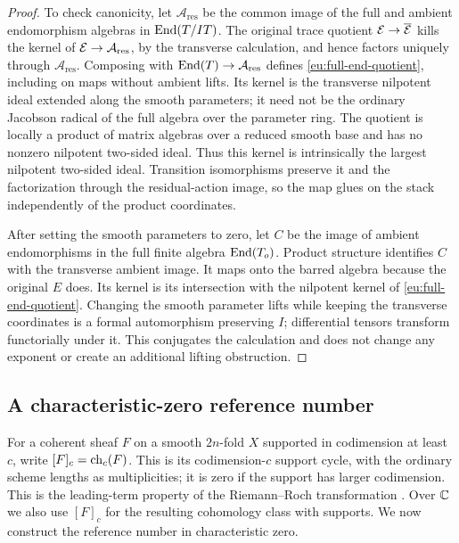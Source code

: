 \begin{proof}
To check canonicity, let $\mathcal A_{\mathrm{res}}$ be the common
image of the full and ambient endomorphism algebras in $\operatorname{End}(T/IT)$.
The original trace quotient $\mathcal E\to\overline{\mathcal E}$ kills the kernel
of $\mathcal E\to\mathcal A_{\mathrm{res}}$, by the transverse calculation,
and hence factors uniquely through $\mathcal A_{\mathrm{res}}$.
Composing with $\operatorname{End}(T)\to\mathcal A_{\mathrm{res}}$ defines
\eqref{eu:full-end-quotient}, including on maps without ambient lifts.
Its kernel is the transverse nilpotent ideal extended along the smooth
parameters; it need not be the ordinary Jacobson radical of the full algebra
over the parameter ring.  The quotient is locally a product of matrix
algebras over a reduced smooth base and has no nonzero nilpotent
two-sided ideal.  Thus this kernel is intrinsically the largest
nilpotent two-sided ideal.  Transition isomorphisms preserve it and
the factorization through the residual-action image, so the map glues
on the stack independently of the product coordinates.

After setting the smooth parameters to zero, let $C$ be the image of
ambient endomorphisms in the full finite algebra $\operatorname{End}(T_o)$.  Product
structure identifies $C$ with the transverse ambient image.  It maps
onto the barred algebra because the original $E$ does.  Its kernel is
its intersection with the nilpotent kernel of
\eqref{eu:full-end-quotient}.  Changing the smooth parameter lifts while
keeping the transverse coordinates is a formal automorphism preserving
$I$; differential tensors transform functorially under it.  This
conjugates the calculation and does not change any exponent or create
an additional lifting obstruction.
\end{proof}

\subsection{A characteristic-zero reference number}

For a coherent sheaf $F$ on a smooth $2n$-fold $X$ supported in
codimension at least $c$, write $[F]_c=\operatorname{ch}_c(F)$.  This is its
codimension-$c$ support cycle, with the ordinary scheme lengths as
multiplicities; it is zero if the support has larger codimension.
This is the leading-term property of the Riemann--Roch transformation
\cite[Chapter~III, \S\S1--2]{BaumFultonMacPherson1975}.  Over $\mathbb C$ we
also use $[F]_c$ for the resulting cohomology class with supports.
We now construct the reference number in characteristic zero.


